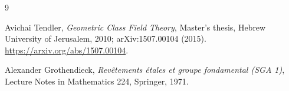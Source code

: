 \documentclass[11pt]{article}
\begin{document}
\begin{thebibliography}{9}

Avichai Tendler,
\emph{Geometric Class Field Theory},
Master's thesis, Hebrew University of Jerusalem, 2010;
arXiv:1507.00104 (2015).
\url{https://arxiv.org/abs/1507.00104}.

Alexander Grothendieck,
\emph{Rev\^etements \'etales et groupe fondamental (SGA 1)},
Lecture Notes in Mathematics 224, Springer, 1971.

\end{thebibliography}
\end{document}
